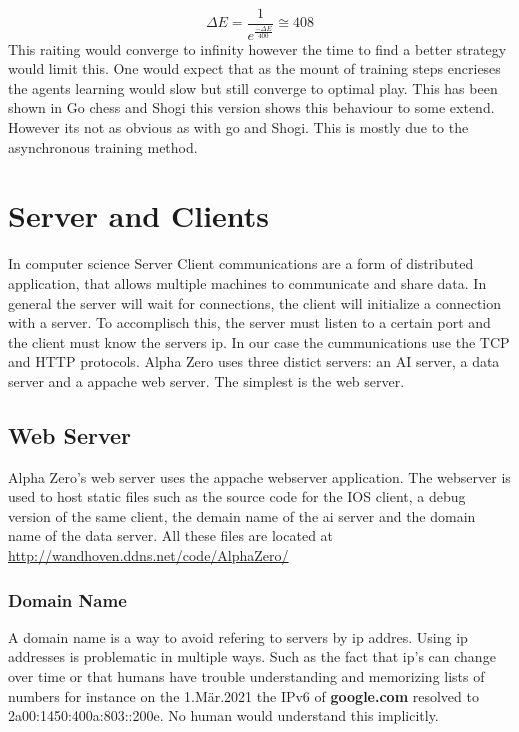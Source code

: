 \documentclass[12pt]{article}
\newcommand{\FittedEloRaiting}{408}
\begin{document}
\begin{equation}
\Delta E = \frac{1}{e^{\frac{-\Delta E}{400}}} \cong \FittedEloRaiting
\end{equation}
This raiting would converge to infinity however the time to find a better strategy would limit this. One would expect that as the mount of training steps encrieses the agents learning would slow but still converge to optimal play. This has been shown in Go chess and Shogi this version shows this behaviour to some extend. However its not as obvious as with go and Shogi. This is mostly due to the asynchronous training method.

\section{Server and Clients}
In computer science Server Client communications are a form of distributed application, that allows multiple machines to communicate and share data. In general the server will wait for connections, the client will initialize a connection with a server. To accomplisch this, the server must listen to a certain port and the client must know the servers ip. In our case the cummunications use the TCP and HTTP protocols. Alpha Zero uses three distict servers: an AI server, a data server and a appache web server. The simplest is the web server.
\subsection{Web Server}
Alpha Zero's web server uses the appache webserver application. The webserver is used to host static files such as the source code for the IOS client, a debug version of the same client, the demain name of the ai server and the domain name of the data server. All these files are located at \href{http://wandhoven.ddns.net/code/AlphaZero/}{http://wandhoven.ddns.net/code/AlphaZero/}
\subsubsection{Domain Name}
A domain name is a way to avoid refering to servers by ip addres. Using ip addresses is problematic in multiple ways. Such as the fact that ip's can change over time or that humans have trouble understanding and memorizing lists of numbers for instance on the 1.Mär.2021 the IPv6 of \textbf{google.com} resolved to 2a00:1450:400a:803::200e. No human would understand this implicitly. 
\end{document}
